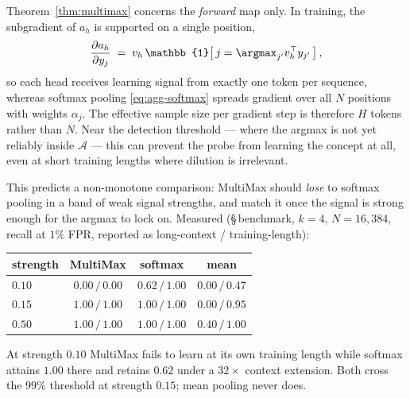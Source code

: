\begin{remark}
\label{rem:gradient-sparsity}
Theorem~\ref{thm:multimax} concerns the \emph{forward} map only. In training, the
subgradient of $a_h$ is supported on a single position,
\begin{equation}
  \frac{\partial a_h}{\partial y_{j}}
  \;=\;v_h\,\mathbb{1}\!\left[\,j=\argmax_{j'} v_h^\top y_{j'}\,\right],
  \label{eq:hardmax-grad}
\end{equation}
so each head receives learning signal from exactly one token per sequence, whereas
softmax pooling \eqref{eq:agg-softmax} spreads gradient over all $N$ positions with
weights $\alpha_j$. The effective sample size per gradient step is therefore $H$ tokens
rather than $N$. Near the detection threshold --- where the argmax is not yet reliably
inside $\mathcal{A}$ --- this can prevent the probe from learning the concept at all,
even at short training lengths where dilution is irrelevant.

This predicts a non-monotone comparison: MultiMax should \emph{lose} to softmax pooling
in a band of weak signal strengths, and match it once the signal is strong enough for the
argmax to lock on. Measured (\S\,benchmark, $k=4$, $N=16{,}384$, recall at $1\%$ FPR,
reported as long-context / training-length):
%
\begin{center}
\begin{tabular}{lccc}
\hline
strength & MultiMax & softmax & mean \\
\hline
$0.10$ & $0.00\,/\,0.00$ & $\mathbf{0.62\,/\,1.00}$ & $0.00\,/\,0.47$\\
$0.15$ & $1.00\,/\,1.00$ & $1.00\,/\,1.00$ & $0.00\,/\,0.95$\\
$0.50$ & $1.00\,/\,1.00$ & $1.00\,/\,1.00$ & $0.40\,/\,1.00$\\
\hline
\end{tabular}
\end{center}
%
At strength $0.10$ MultiMax fails to learn at its own training length while softmax
attains $1.00$ there and retains $0.62$ under a $32\times$ context extension. Both cross
the $99\%$ threshold at strength $0.15$; mean pooling never does.
\end{remark}

